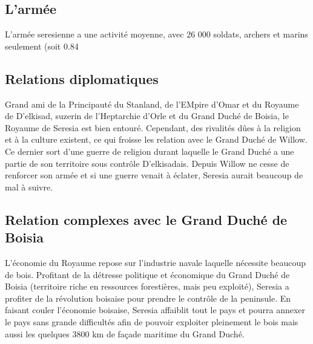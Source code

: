 \documentclass[french, a4paper, 12pt]{article}
\begin{document}
\subsection{L'armée}

L'armée seresienne a une activité moyenne, avec 26 000 soldats, archers et marins seulement (soit 0.84%

\subsection{Relations diplomatiques}

Grand ami de la Principauté du Stanland, de l'EMpire d'Omar et du Royaume de D'elkisad, suzerin de l'Heptarchie d'Orle et du Grand Duché de Boisia, le Royaume de Seresia est bien entouré. Cependant, des rivalités dûes à la religion et à la culture existent, ce qui froisse les relation avec le Grand Duché de Willow. Ce dernier sort d'une guerre de religion durant laquelle le Grand Duché a une partie de son territoire sous contrôle D'elkisadais. Depuis Willow ne cesse de renforcer son armée et si une guerre venait à éclater, Seresia aurait beaucoup de mal à suivre.

\subsection{Relation complexes avec le Grand Duché de Boisia}

L'économie du Royaume repose sur l'industrie navale laquelle nécessite beaucoup de bois. Profitant de la détresse politique et économique du Grand Duché de Boisia (territoire riche en ressources forestières, mais peu exploité), Seresia a profiter de la révolution boisaise pour prendre le contrôle de la peninsule. En faisant couler l'économie boisaise, Seresia affaiblit tout le pays et pourra annexer le pays sans grande difficultés afin de pouvoir exploiter pleinement le bois mais aussi les quelques 3800 km de façade maritime du Grand Duché.
\end{document}
